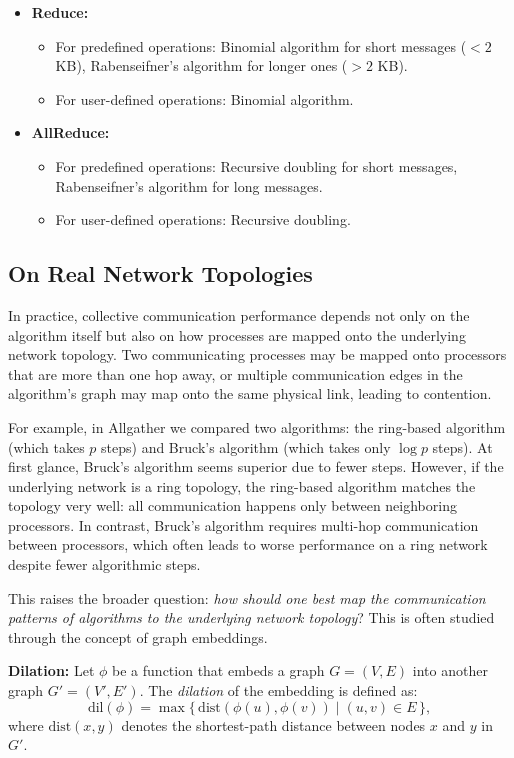 \documentclass[12pt]{book}
\begin{document}
\begin{itemize}
    \item \textbf{Reduce:}
    \begin{itemize}
        \item For predefined operations: Binomial algorithm for short messages ($<2$ KB), Rabenseifner’s algorithm for longer ones ($>2$ KB).
        \item For user-defined operations: Binomial algorithm.
    \end{itemize}

    \item \textbf{AllReduce:}
    \begin{itemize}
        \item For predefined operations: Recursive doubling for short messages, Rabenseifner’s algorithm for long messages.
        \item For user-defined operations: Recursive doubling.
    \end{itemize}
\end{itemize}


\subsection{On Real Network Topologies}
In practice, collective communication performance depends not only on the algorithm itself but also on how processes are mapped onto the underlying network topology. Two communicating processes may be mapped onto processors that are more than one hop away, or multiple communication edges in the algorithm’s graph may map onto the same physical link, leading to contention.

For example, in Allgather we compared two algorithms: the ring-based algorithm (which takes $p$ steps) and Bruck's algorithm (which takes only $\log p$ steps). At first glance, Bruck’s algorithm seems superior due to fewer steps. However, if the underlying network is a ring topology, the ring-based algorithm matches the topology very well: all communication happens only between neighboring processors. In contrast, Bruck’s algorithm requires multi-hop communication between processors, which often leads to worse performance on a ring network despite fewer algorithmic steps.

This raises the broader question: \textit{how should one best map the communication patterns of algorithms to the underlying network topology}? This is often studied through the concept of graph embeddings.

\textbf{Dilation:}  
Let $\phi$ be a function that embeds a graph $G=(V,E)$ into another graph $G'=(V',E')$. The \textit{dilation} of the embedding is defined as:
\[
\text{dil}(\phi) = \max \{ \, \text{dist}(\phi(u), \phi(v)) \;|\; (u,v) \in E \,\},
\]
where $\text{dist}(x,y)$ denotes the shortest-path distance between nodes $x$ and $y$ in $G'$.
\end{document}
